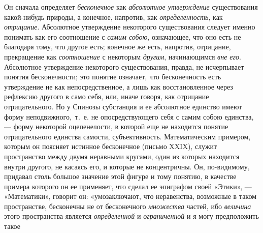 Он сначала определяет {\em бесконечное} как
{\em абсолютное утверждение} существования какой-нибудь
природы, а конечное, напротив, как
{\em определенность}, как
{\em отрицание}. Абсолютное утверждение некоторого
существования следует именно понимать как его соотношение с
{\em самим собою}, означающее, что оно есть не
благодаря тому, что другое есть; конечное же есть, напротив, отрицание,
прекращение как {\em соотношение} с некоторым
{\em другим}, начинающимся {\em вне
его}. Абсолютное утверждение некоторого существования, правда, не
исчерпывает понятия бесконечности; это понятие означает, что бесконечность
есть утверждение не как непосредственное, а лишь как восстановленное через
рефлексию другого в само себя, или, иначе говоря, как отрицание
отрицательного. Но у Спинозы субстанция и ее абсолютное единство имеют
форму неподвижного,~т.~е. не опосредствующего себя с самим собою единства,
— форму некоторой оцепенелости, в которой еще не находится понятие
отрицательного единства самости, субъективность.
\label{bkm:bm52b}
Математическим примером, которым он поясняет истинное бесконечное (письмо
XXIX), служит пространство между двумя неравными кругами, один из которых
находится внутри другого, не касаясь его, и которые не концентричны. Он,
по-видимому, придавал столь большое значение этой фигуре и тому понятию, в
качестве примера
которого он ее применяет, что сделал ее
эпиграфом своей
«Этики», — «Математики», говорит он:
«умозаключают, что неравенства, возможные в таком пространстве, бесконечны
не от бесконечного {\em множества} частей, ибо
{\em величина} этого пространства является
{\em определенной} и
{\em ограниченной} и я могу предположить такое
